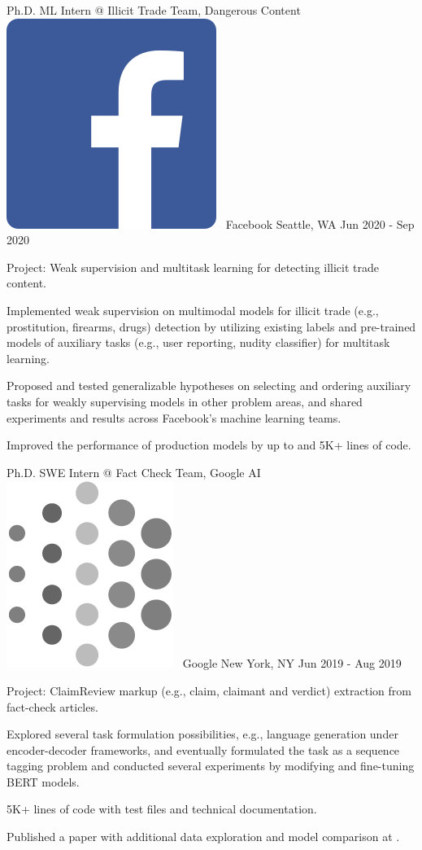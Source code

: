 \documentclass[letterpaper]{awesome-cv}
\begin{document}
\addvspace{0.2ex}
\begin{cventries}
  \cventry
    {Ph.D. ML Intern @ Illicit Trade Team, Dangerous Content}
    {\includegraphics[height=0.016\textwidth]{../images/logos/facebook.png}~ Facebook}
    {Seattle, WA}
    {Jun 2020 - Sep 2020}
    {
      \begin{cvitems}
        \item {Project: Weak supervision and multitask learning for detecting illicit trade content.}
        \item {Implemented weak supervision on multimodal models for illicit trade (e.g., prostitution, firearms, drugs) detection by utilizing existing labels and pre-trained models of auxiliary tasks (e.g., user reporting, nudity classifier) for multitask learning.}
        \item {Proposed and tested generalizable hypotheses on selecting and ordering auxiliary tasks for weakly supervising models in other problem areas, and shared experiments and results across Facebook's machine learning teams.}
        \item {Improved the performance of production models by up to  and  5K+ lines of code.}
      \end{cvitems}
    }
  \cventry
    {Ph.D. SWE Intern @ Fact Check Team, Google AI}
    {\includegraphics[height=0.017\textwidth]{../images/logos/google_ai.png}~ Google}
    {New York, NY}
    {Jun 2019 - Aug 2019}
    {
      \begin{cvitems}
        \item {Project: ClaimReview markup (e.g., claim, claimant and verdict) extraction from fact-check articles.}
        \item {Explored several task formulation possibilities, e.g., language generation under encoder-decoder frameworks, and eventually formulated the task as a sequence tagging problem and conducted several experiments by modifying and fine-tuning BERT models.}
        \item { 5K+ lines of code with test files and technical documentation.}
        \item {Published a paper with additional data exploration and model comparison at .}

\end{cvitems}}
\end{cventries}
\end{document}
